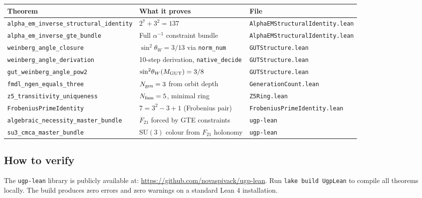 \documentclass[11pt,a4paper]{article}
\newcommand{\sinwsq}{\sin^2\!\theta_W}
\begin{document}
\begin{center}
\small
\begin{tabular}{p{4.8cm}p{4.0cm}p{4.0cm}}
\toprule
Theorem & What it proves & File \\
\midrule
\texttt{alpha\_em\_inverse\_\allowbreak{}structural\_identity}
  & $2^7 + 3^2 = 137$
  & \texttt{AlphaEMStructural\-Identity.lean} \\[2pt]
\texttt{alpha\_em\_inverse\_\allowbreak{}gte\_bundle}
  & Full $\alpha^{-1}$ constraint bundle
  & \texttt{AlphaEMStructural\-Identity.lean} \\[2pt]
\texttt{weinberg\_angle\_closure}
  & $\sinwsq = 3/13$ via \texttt{norm\_num}
  & \texttt{GUTStructure.lean} \\[2pt]
\texttt{weinberg\_angle\_\allowbreak{}derivation}
  & 10-step derivation, \texttt{native\_decide}
  & \texttt{GUTStructure.lean} \\[2pt]
\texttt{gut\_weinberg\_angle\_pow2}
  & $\sinwsq(M_{\rm GUT}) = 3/8$
  & \texttt{GUTStructure.lean} \\[2pt]
\texttt{fmdl\_ngen\_equals\_three}
  & $N_{\rm gen} = 3$ from orbit depth
  & \texttt{Generation\-Count.lean} \\[2pt]
\texttt{z5\_transitivity\_\allowbreak{}uniqueness}
  & $N_{\rm fam} = 5$, minimal ring
  & \texttt{Z5Ring.lean} \\[2pt]
\texttt{FrobeniusPrimeIdentity}
  & $7 = 3^2-3+1$ (Frobenius pair)
  & \texttt{Frobenius\-PrimeIdentity.lean} \\[2pt]
\texttt{algebraic\_necessity\_\allowbreak{}master\_bundle}
  & $F_{21}$ forced by GTE constraints
  & \texttt{ugp-lean} \\[2pt]
\texttt{su3\_cmca\_master\_bundle}
  & SU$(3)$ colour from $F_{21}$ holonomy
  & \texttt{ugp-lean} \\
\bottomrule
\end{tabular}
\end{center}
\normalsize

\subsection{How to verify}

The \texttt{ugp-lean} library is publicly available at:
\url{https://github.com/novaspivack/ugp-lean}.
Run \texttt{lake build UgpLean} to compile all theorems locally.
The build produces zero errors and zero warnings on a standard Lean 4 installation.

\end{document}

